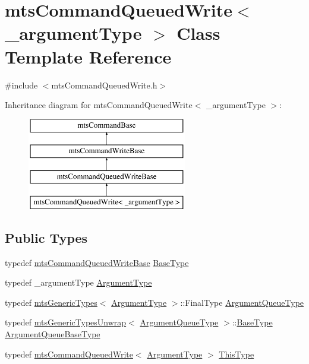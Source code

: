 \hypertarget{classmts_command_queued_write}{}\section{mts\+Command\+Queued\+Write$<$ \+\_\+argument\+Type $>$ Class Template Reference}
\label{classmts_command_queued_write}


{\ttfamily \#include $<$mts\+Command\+Queued\+Write.\+h$>$}

Inheritance diagram for mts\+Command\+Queued\+Write$<$ \+\_\+argument\+Type $>$\+:\begin{figure}[H]
\begin{center}
\leavevmode
\includegraphics[height=4.000000cm]{d9/d85/classmts_command_queued_write}
\end{center}
\end{figure}
\subsection*{Public Types}
\begin{DoxyCompactItemize}
\item 
typedef \hyperlink{classmts_command_queued_write_base}{mts\+Command\+Queued\+Write\+Base} \hyperlink{classmts_command_queued_write_a45b3d0b46248285d3535ad64ee93a28d}{Base\+Type}
\item 
typedef \+\_\+argument\+Type \hyperlink{classmts_command_queued_write_a2f29807aedb1cbd9293f3f5bfbace404}{Argument\+Type}
\item 
typedef \hyperlink{classmts_generic_types}{mts\+Generic\+Types}$<$ \hyperlink{classmts_command_queued_write_a2f29807aedb1cbd9293f3f5bfbace404}{Argument\+Type} $>$\+::Final\+Type \hyperlink{classmts_command_queued_write_a782b598b821585636a6a4f2039368b49}{Argument\+Queue\+Type}
\item 
typedef \hyperlink{classmts_generic_types_unwrap}{mts\+Generic\+Types\+Unwrap}$<$ \hyperlink{classmts_command_queued_write_a782b598b821585636a6a4f2039368b49}{Argument\+Queue\+Type} $>$\+::\hyperlink{classmts_command_queued_write_a45b3d0b46248285d3535ad64ee93a28d}{Base\+Type} \hyperlink{classmts_command_queued_write_a4fe3711262b382c4e23857c2e4f35979}{Argument\+Queue\+Base\+Type}
\item 
typedef \hyperlink{classmts_command_queued_write}{mts\+Command\+Queued\+Write}$<$ \hyperlink{classmts_command_queued_write_a2f29807aedb1cbd9293f3f5bfbace404}{Argument\+Type} $>$ \hyperlink{classmts_command_queued_write_aff1e774ee1a65b26df3a2924f8a9bff6}{This\+Type}
\end{DoxyCompactItemize}
